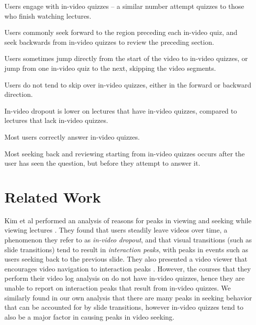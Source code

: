 \documentclass{sigchi}
\begin{document}
\begin{compactitem}
\item Users engage with in-video quizzes -- a similar number attempt quizzes to those who finish watching lectures.
\item Users commonly seek forward to the region preceding each in-video quiz, and seek backwards from in-video quizzes to review the preceding section.
\item Users sometimes jump directly from the start of the video to in-video quizzes, or jump from one in-video quiz to the next, skipping the video segments.
\item Users do not tend to skip over in-video quizzes, either in the forward or backward direction. %
\item In-video dropout is lower on lectures that have in-video quizzes, compared to lectures that lack in-video quizzes.
\item Most users correctly answer in-video quizzes.
\item Most seeking back and reviewing starting from in-video quizzes occurs after the user has seen the question, but before they attempt to answer it.
\end{compactitem}


\newpage

\section{Related Work}

Kim et al performed an analysis of reasons for peaks in viewing and seeking while viewing lectures \cite{juho}. They found that users steadily leave videos over time, a phenomenon they refer to as \emph{in-video dropout}, and that visual transitions (such as slide transitions) tend to result in \emph{interaction peaks}, with peaks in events such as users seeking back to the previous slide. They also presented a video viewer that encourages video navigation to interaction peaks  \cite{juho2}. However, the courses that they perform their video log analysis on do not have in-video quizzes, hence they are unable to report on interaction peaks that result from in-video quizzes. We similarly found in our own analysis that there are many peaks in seeking behavior that can be accounted for by slide transitions, however in-video quizzes tend to also be a major factor in causing peaks in video seeking.
\end{document}
